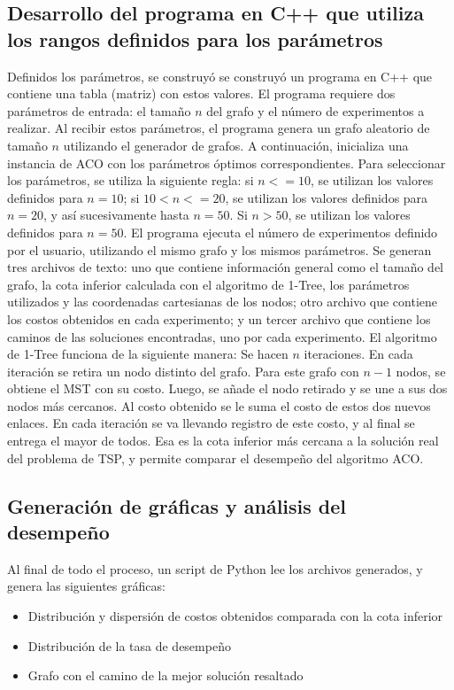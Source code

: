 \documentclass[conference]{IEEEtran}
\begin{document}
\subsection{Desarrollo del programa en C++ que utiliza los rangos definidos para los parámetros}
Definidos los parámetros, se construyó se construyó un programa en C++ que contiene una tabla (matriz) con estos valores. 
El programa requiere dos parámetros de entrada: el tamaño $n$ del grafo y el número de experimentos a realizar. Al recibir estos parámetros, el programa genera un grafo aleatorio de tamaño $n$ utilizando el generador de grafos. A continuación, inicializa una instancia de ACO con los parámetros óptimos correspondientes. Para seleccionar los parámetros, se utiliza la siguiente regla: si $n <= 10$, se utilizan los valores definidos para $n=10$; si $10 < n <= 20$, se utilizan los valores definidos para $n=20$, y así sucesivamente hasta $n=50$. Si $n>50$, se utilizan los valores definidos para $n=50$.
El programa ejecuta el número de experimentos definido por el usuario, utilizando el mismo grafo y los mismos parámetros. Se generan tres archivos de texto: uno que contiene información general como el tamaño del grafo, la cota inferior calculada con el algoritmo de 1-Tree, los parámetros utilizados y las coordenadas cartesianas de los nodos; otro archivo que contiene los costos obtenidos en cada experimento; y un tercer archivo que contiene los caminos de las soluciones encontradas, uno por cada experimento.
El algoritmo de 1-Tree funciona de la siguiente manera: Se hacen $n$ iteraciones. En cada iteración se retira un nodo distinto del grafo. Para este grafo con $n-1$ nodos, se obtiene el MST con su costo. Luego, se añade el nodo retirado y se une a sus dos nodos más cercanos. Al costo obtenido se le suma el costo de estos dos nuevos enlaces. En cada iteración se va llevando registro de este costo, y al final se entrega el mayor de todos. Esa es la cota inferior más cercana a la solución real del problema de TSP, y permite comparar el desempeño del algoritmo ACO.
\subsection{Generación de gráficas y análisis del desempeño}
Al final de todo el proceso, un script de Python lee los archivos generados, y genera las siguientes gráficas:
\begin{itemize}
\item Distribución y dispersión de costos obtenidos comparada con la cota inferior
\item Distribución de la tasa de desempeño
\item Grafo con el camino de la mejor solución resaltado
\end{itemize}
\end{document}

